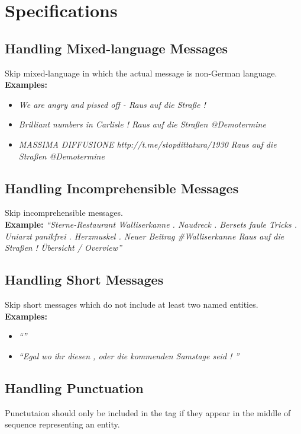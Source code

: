 \section*{Specifications}

\subsection*{Handling Mixed-language Messages}
Skip mixed-language in which the actual message is non-German language.\\

\noindent\textbf{Examples:}

\begin{itemize}
	\item \textit{We are angry and pissed off - Raus auf die Straße \@Demotermine!}
	\item \textit{Brilliant numbers in Carlisle ! Raus auf die Straßen @Demotermine}
	\item \textit{MASSIMA DIFFUSIONE http://t.me/stopdittatura/1930 Raus auf die Straßen @Demotermine}
\end{itemize}

\subsection*{Handling Incomprehensible Messages}
Skip incomprehensible messages.\\

\noindent\textbf{Example:} \textit{``Sterne-Restaurant Walliserkanne . Naudreck . Bersets faule Tricks . Uniarzt panikfrei . Herzmuskel .  Neuer Beitrag \#Walliserkanne Raus auf die Straßen \@Demotermine! Übersicht / Overview''}

\subsection*{Handling Short Messages}
Skip short messages which do not include at least two named entities.\\ 

\noindent\textbf{Examples:}
\begin{itemize}
	\item \textit{``\@AnwaelteFuerAufklaerung \@Demotermine''}
	\item \textit{``Egal wo ihr diesen , oder die kommenden Samstage seid ! \@RheinCandleLight \@Demotermine''}
\end{itemize}

\subsection*{Handling Punctuation}
Punctutaion should only be included in the tag if they appear in the middle of sequence representing an entity.\\

